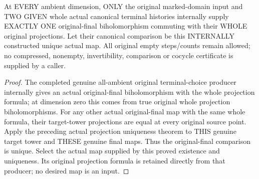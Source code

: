 \begin{theorem}
\label{hir:original-ambient-terminal-choice-intrinsic-unique-comparison}
\leanok
At EVERY ambient dimension, ONLY the original marked-domain input and TWO
GIVEN whole actual canonical terminal histories internally supply EXACTLY
ONE original-final biholomorphism commuting with their WHOLE original
projections. Let their canonical comparison be this INTERNALLY constructed
unique actual map. All original empty steps/counts remain allowed; no
compressed, nonempty, invertibility, comparison or cocycle certificate
is supplied by a caller.
\end{theorem}
\begin{proof}
The completed genuine all-ambient original terminal-choice producer
internally gives an actual original-final biholomorphism with the whole
projection formula; at dimension zero this comes from true original whole
projection biholomorphisms. For any other actual original-final map with
the same whole formula, their target-tower projections are equal at every
original source point. Apply the preceding actual projection uniqueness
theorem to THIS genuine target tower and THESE genuine final maps. Thus
the original-final comparison is unique. Select the actual map supplied
by this proved existence and uniqueness. Its original projection formula
is retained directly from that producer; no desired map is an input.
\end{proof}

